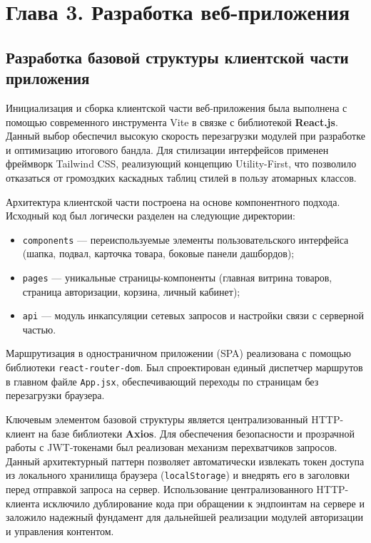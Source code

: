 
\section*{Глава 3. Разработка веб-приложения}

\subsection{Разработка базовой структуры клиентской части приложения}

Инициализация и сборка клиентской части веб-приложения была выполнена с помощью современного инструмента 
Vite в связке с библиотекой \textbf{React.js}. Данный выбор обеспечил высокую скорость перезагрузки 
модулей при разработке и оптимизацию итогового бандла. Для стилизации интерфейсов применен фреймворк Tailwind CSS, реализующий 
концепцию Utility-First, что позволило отказаться от громоздких каскадных таблиц стилей в пользу атомарных классов.

Архитектура клиентской части построена на основе компонентного подхода. Исходный код был логически разделен на следующие директории:
\begin{itemize}
    \item \texttt{components} — переиспользуемые элементы пользовательского интерфейса (шапка, подвал, карточка товара, боковые панели дашбордов);
    \item \texttt{pages} — уникальные страницы-компоненты (главная витрина товаров, страница авторизации, корзина, личный кабинет);
    \item \texttt{api} — модуль инкапсуляции сетевых запросов и настройки связи с серверной частью.
\end{itemize}

Маршрутизация в одностраничном приложении (SPA) реализована с помощью библиотеки \texttt{react-router-dom}. Был спроектирован единый диспетчер маршрутов в главном файле \texttt{App.jsx}, обеспечивающий переходы по страницам без перезагрузки браузера. 

Ключевым элементом базовой структуры является централизованный HTTP-клиент на базе библиотеки \textbf{Axios}. Для обеспечения безопасности и прозрачной работы с 
JWT-токенами был реализован механизм перехватчиков запросов. Данный архитектурный паттерн позволяет автоматически извлекать токен доступа из 
локального хранилища браузера (\texttt{localStorage}) и внедрять его в заголовки перед отправкой запроса на сервер. Использование централизованного 
HTTP-клиента исключило дублирование кода при обращении к эндпоинтам на сервере и заложило надежный фундамент для дальнейшей реализации модулей авторизации и 
управления контентом.

